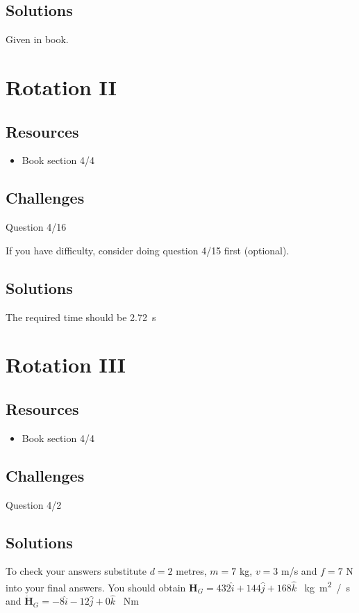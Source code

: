 \subsection*{Solutions}
Given in book.




\newpage
\section{Rotation II}

\subsection*{Resources}
\begin{itemize}
    \item Book section 4/4
\end{itemize}

\subsection*{Challenges}
Question 4/16

If you have difficulty, consider doing question 4/15 first (optional).

\subsection*{Solutions}
The required time should be \SI{2.72}{s}




\newpage
\section{Rotation III}

\subsection*{Resources}
\begin{itemize}
    \item Book section 4/4
\end{itemize}

\subsection*{Challenges}
Question 4/2

\subsection*{Solutions}
To check your answers substitute $d=2$ metres, $m=7$ kg, $v=3$ m/s and $f=7$ N into your final answers.
You should obtain
$\bm{H}_G = 432 \hat{i} + 144 \hat{j} + 168 \hat{k}$ \SI{}{kg m^2 /s}
and
$\dot{\bm{H}}_G = -8 \hat{i} - 12 \hat{j} + 0 \hat{k}$ \SI{}{Nm}




